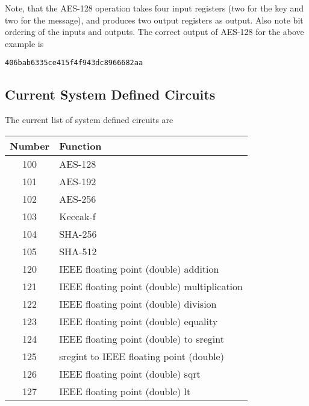 Note, that the AES-128 operation takes four
input registers (two for the key and two for
the message), and produces two output registers
as output.
Also note bit ordering of the inputs and outputs.
The correct output of AES-128 for the above
example is
\begin{center}
  \verb|406bab6335ce415f4f943dc8966682aa|
\end{center}


\subsection{Current System Defined Circuits}
The current list of system defined circuits are
\begin{center}
\begin{tabular}{c|l}
Number & Function \\
\hline
100 & AES-128 \\
101 & AES-192 \\
102 & AES-256 \\
103 & Keccak-f \\
104 & SHA-256 \\
105 & SHA-512 \\
\hline
120 & IEEE floating point (double) addition \\
121 & IEEE floating point (double) multiplication \\
122 & IEEE floating point (double) division \\
123 & IEEE floating point (double) equality \\
124 & IEEE floating point (double) to sregint \\
125 & sregint to IEEE floating point (double) \\
126 & IEEE floating point (double) sqrt \\
127 & IEEE floating point (double) lt \\
\hline
\end{tabular}
\end{center}

